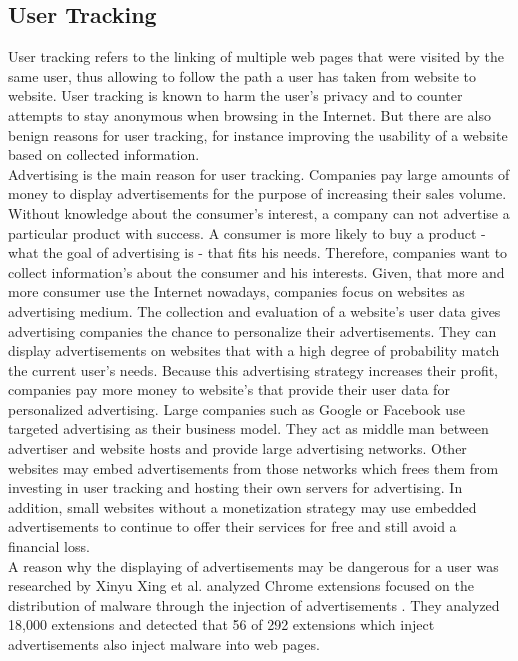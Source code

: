 \documentclass[article,colorback,accentcolor=tud9c,type=bsc]{tudthesis}
\let\stdsubsection\subsection
\renewcommand\subsection{\newpage\stdsubsection}
\begin{document}
	
\subsection{User Tracking}
	
	User tracking refers to the linking of multiple web pages that were visited by the same user, thus allowing to follow the path a user has taken from website to website. User tracking is known to harm the user's privacy and to counter attempts to stay anonymous when browsing in the Internet. %
	But there are also benign reasons for user tracking, for instance improving the usability of a website based on collected information. \\ 
	
	Advertising is the main reason for user tracking. Companies pay large amounts of money to display advertisements for the purpose of increasing their sales volume. Without knowledge about the consumer's interest, a company can not advertise a particular product with success. A consumer is more likely to buy a product - what the goal of advertising is - that fits his needs. Therefore, companies want to collect information's about the consumer and his interests. Given, that more and more consumer use the Internet nowadays, companies focus on websites as advertising medium. The collection and evaluation of a website's user data gives advertising companies the chance to personalize their advertisements. They can display advertisements on websites that with a high degree of probability match the current user's needs. Because this advertising strategy increases their profit, companies pay more money to website's that provide their user data for personalized advertising. Large companies such as Google or Facebook use targeted advertising as their business model. They act as middle man between advertiser and website hosts and provide large advertising networks. Other websites may embed advertisements from those networks which frees them from investing in user tracking and hosting their own servers for advertising. In addition, small websites without a monetization strategy may use embedded advertisements to continue to offer their services for free and still avoid a financial loss. \\
	
	A reason why the displaying of advertisements may be dangerous for a user was researched by Xinyu Xing et al. analyzed Chrome extensions focused on the distribution of malware through the injection of advertisements \cite{Xing:2015:UMT:2736277.2741630}. They analyzed 18,000 extensions and detected that 56 of 292 extensions which inject advertisements also inject malware into web pages. %
	\\
	
\end{document}
